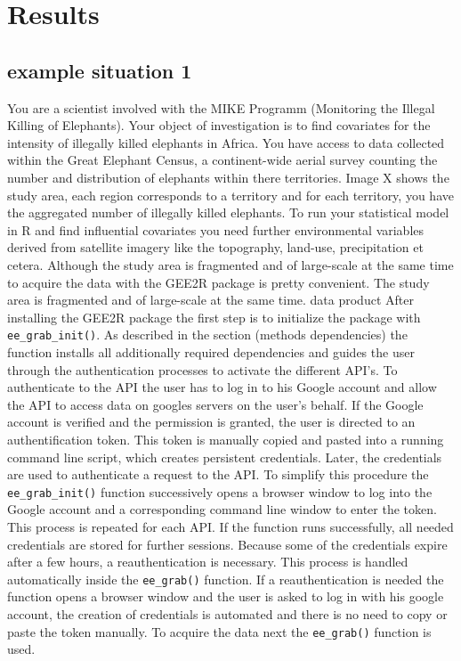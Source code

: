 \chapter{Results}

\section{example situation 1}

You are a scientist involved with the MIKE Programm (Monitoring the Illegal Killing of Elephants). Your object of investigation is to find covariates for the intensity of illegally killed elephants in Africa. You have access to data collected within the Great Elephant Census, a continent-wide aerial survey counting the number and distribution of elephants within there territories. 
Image X shows the study area, each region corresponds to a territory and for each territory, you have the aggregated number of illegally killed elephants. To run your statistical model in R and find influential covariates you need further environmental variables derived from satellite imagery like the topography, land-use, precipitation et cetera. 
Although the study area is fragmented and of large-scale at the same time to acquire the data with the GEE2R package is pretty convenient.
The study area is fragmented and of large-scale at the same time. 
data product
After installing the GEE2R package the first step is to initialize the package with \texttt{ee\_grab\_init()}. As described in the section (methods dependencies) the function installs all additionally required dependencies and guides the user through the authentication processes to activate the different API's. To authenticate to the API the user has to log in to his Google account and allow the API to access data on googles servers on the user's behalf. If the Google account is verified and the permission is granted, the user is directed to an authentification token. This token is manually copied and pasted into a running command line script, which creates persistent credentials. 
Later, the credentials are used to authenticate a request to the API. To simplify this procedure the \texttt{ee\_grab\_init()} function successively opens a browser window to log into the Google account and a corresponding command line window to enter the token. This process is repeated for each API. If the function runs successfully, all needed credentials are stored for further sessions. Because some of the credentials expire after a few hours, a reauthentication is necessary. This process is handled automatically inside the \texttt{ee\_grab()} function. If a reauthentication is needed the function opens a browser window and the user is asked to log in with his google account, the creation of credentials is automated and there is no need to copy or paste the token manually.
To acquire the data next the \texttt{ee\_grab()} function is used.

